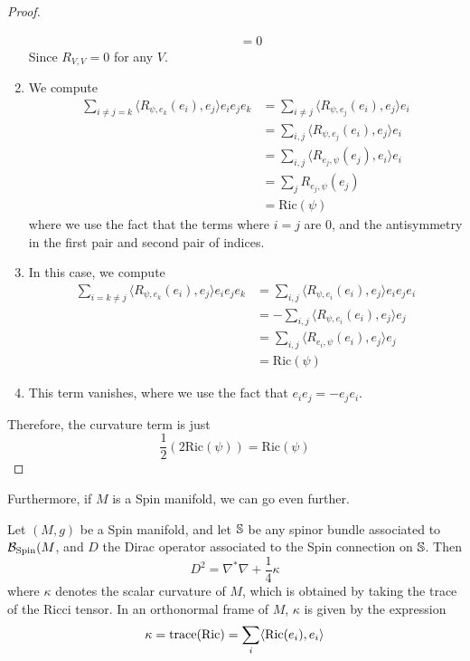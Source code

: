 \begin{proof}
\begin{enumerate}
\begin{align*}
  &= 0
  \end{align*}
  Since $R_{V,V} = 0$ for any $V$.
  \item We compute
  \begin{align*}
  \sum_{i \neq j = k}\langle R_{\psi,e_k}(e_i), e_j\rangle e_ie_je_k
  &= \sum_{i \neq j} \langle R_{\psi, e_j}(e_i), e_j\rangle e_i \\
  &= \sum_{i,j} \langle R_{\psi, e_j}(e_i), e_j \rangle e_i \\
  &= \sum_{i,j} \langle R_{e_j, \psi}(e_j),e_i \rangle e_i \\
  &= \sum_{j} R_{e_j, \psi}(e_j) \\
  &= \mathrm{Ric}(\psi)
  \end{align*}
  where we use the fact that the terms where $i = j$ are $0$, and the antisymmetry
  in the first pair and second pair of indices.
  \item In this case, we compute
  \begin{align*}
  \sum_{i = k \neq j}\langle R_{\psi,e_k}(e_i), e_j\rangle e_ie_je_k
  &= \sum_{i,j} \langle R_{\psi, e_i}(e_i), e_j \rangle e_ie_je_i \\
  &= -\sum_{i,j} \langle R_{\psi, e_i}(e_i), e_j \rangle e_j \\
  &= \sum_{i,j} \langle R_{e_i, \psi}(e_i) , e_j \rangle e_j \\
  &= \mathrm{Ric}(\psi)
  \end{align*}
  \item This term vanishes, where we use the fact that $e_ie_j = -e_je_i$.
\end{enumerate}
Therefore, the curvature term is just
\[
\frac{1}{2} \left( 2\mathrm{Ric}(\psi) \right) = \mathrm{Ric}(\psi)
\]
\end{proof}
%
Furthermore, if $M$ is a Spin manifold, we can go even further.
%
\begin{thm}[\ib{Lichnerowicz}]
Let $(M,g)$ be a Spin manifold, and let $\S$ be any spinor bundle associated to
$\B_{\Spin}(M$, and $D$ the Dirac operator associated to the Spin connection on $\S$.
Then
\[
D^2 = \nabla^*\nabla + \frac{1}{4}\kappa
\]
where $\kappa$ denotes the scalar curvature of $M$, which is obtained by taking
the trace of the Ricci tensor. In an orthonormal frame of $M$, $\kappa$ is given by
the expression
\[
\kappa = \trace(\mathrm{Ric}) = \sum_{i} \langle \mathrm{Ric}(e_i), e_i \rangle
\]
\end{thm}
%

